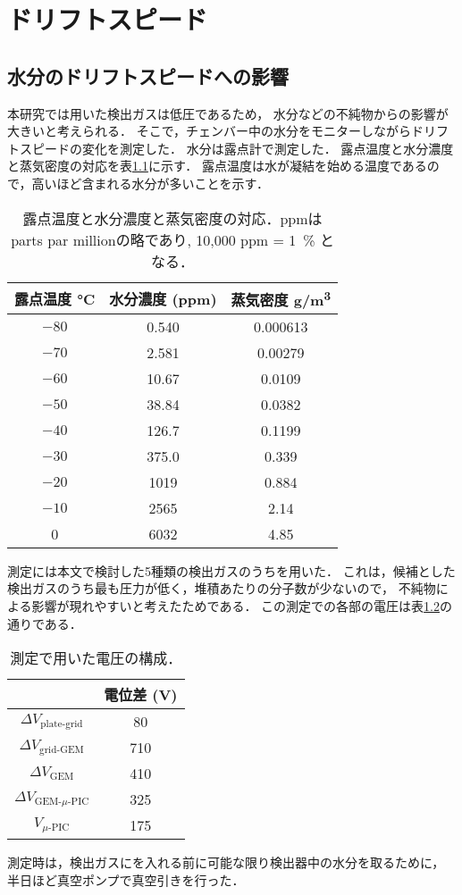 \documentclass[../master]{subfiles}
\begin{document}
\chapter{ドリフトスピード}
\section{水分のドリフトスピードへの影響}
本研究では用いた検出ガスは低圧であるため，
水分などの不純物からの影響が大きいと考えられる．
そこで，チェンバー中の水分をモニターしながらドリフトスピードの変化を測定した．
水分は露点計で測定した．
露点温度と水分濃度と蒸気密度の対応を表\ref{tab::dew_point_humidity}に示す．
露点温度は水が凝結を始める温度であるので，高いほど含まれる水分が多いことを示す．
\begin{table}
  \centering
  \caption{露点温度と水分濃度と蒸気密度の対応．ppmはparts par millionの略であり, 10,000 ppm = \SI{1}{\percent} となる．}
  \label{tab::dew_point_humidity}
  \begin{tabular}{ccc}
    \toprule
    露点温度 \si{\degreeCelsius} & 水分濃度 (ppm) & 蒸気密度 \si{\gram/\cubic\metre} \\
    \midrule
    $-80$ & 0.540 & 0.000613 \\
    $-70$ & 2.581 & 0.00279 \\
    $-60$ & 10.67 & 0.0109 \\
    $-50$ & 38.84 & 0.0382 \\
    $-40$ & 126.7 & 0.1199 \\
    $-30$ & 375.0 & 0.339 \\
    $-20$ & 1019 & 0.884 \\
    $-10$ & 2565 & 2.14 \\
    0     & 6032 & 4.85 \\
    \bottomrule
  \end{tabular}
\end{table}
測定には本文で検討した5種類の検出ガスのうち\Methane を用いた．
これは，候補とした検出ガスのうち最も圧力が低く，堆積あたりの分子数が少ないので，
不純物による影響が現れやすいと考えたためである．
この測定での各部の電圧は表\ref{tab::configuration_for_drift_dep}の通りである．
\begin{table}
  \centering
  \caption{測定で用いた電圧の構成．}
  \label{tab::configuration_for_drift_dep}
  \begin{tabular}{cc}
    \toprule
    & 電位差 (\si{\volt}) \\
    \midrule
    $\Delta V_{\text{plate-grid}}$ & 80 \\
    $\Delta V_{\text{grid-GEM}}$ & 710 \\
    $\Delta V_{\text{GEM}}$ & 410 \\
    $\Delta V_{\text{GEM-}\mu\text{-PIC}}$ & 325 \\
    $V_{\mu\text{-PIC}}$ & 175 \\
    \bottomrule
  \end{tabular}
\end{table}
測定時は，検出ガスにを入れる前に可能な限り検出器中の水分を取るために，
半日ほど真空ポンプで真空引きを行った．
\end{document}

